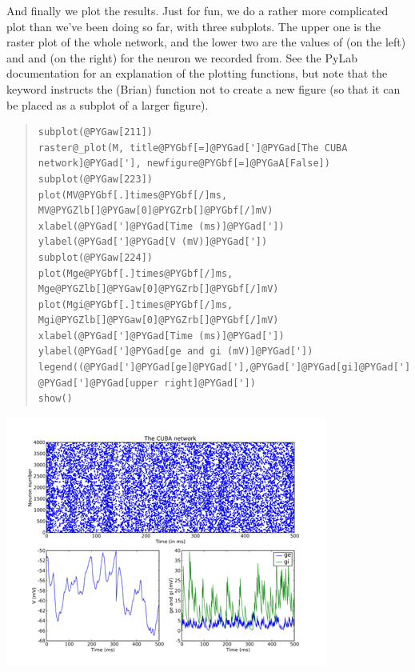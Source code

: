 \documentclass[letterpaper,10pt,english]{manual}
\begin{document}
And finally we plot the results. Just for fun, we do a rather more
complicated plot than we've been doing so far, with three subplots.
The upper one is the raster plot of the whole network, and the
lower two are the values of  (on the left) and  and  (on the
right) for the neuron we recorded from. See the PyLab documentation
for an explanation of the plotting functions, but note that the
\hyperlink{brian.raster_plot}{} keyword  instructs the (Brian) function
\hyperlink{brian.raster_plot}{} not to create a new figure (so that it can be placed
as a subplot of a larger figure).
\begin{quote}

\begin{Verbatim}[commandchars=@\[\]]
subplot(@PYGaw[211])
raster@_plot(M, title@PYGbf[=]@PYGad[']@PYGad[The CUBA network]@PYGad['], newfigure@PYGbf[=]@PYGaA[False])
subplot(@PYGaw[223])
plot(MV@PYGbf[.]times@PYGbf[/]ms, MV@PYGZlb[]@PYGaw[0]@PYGZrb[]@PYGbf[/]mV)
xlabel(@PYGad[']@PYGad[Time (ms)]@PYGad['])
ylabel(@PYGad[']@PYGad[V (mV)]@PYGad['])
subplot(@PYGaw[224])
plot(Mge@PYGbf[.]times@PYGbf[/]ms, Mge@PYGZlb[]@PYGaw[0]@PYGZrb[]@PYGbf[/]mV)
plot(Mgi@PYGbf[.]times@PYGbf[/]ms, Mgi@PYGZlb[]@PYGaw[0]@PYGZrb[]@PYGbf[/]mV)
xlabel(@PYGad[']@PYGad[Time (ms)]@PYGad['])
ylabel(@PYGad[']@PYGad[ge and gi (mV)]@PYGad['])
legend((@PYGad[']@PYGad[ge]@PYGad['],@PYGad[']@PYGad[gi]@PYGad[']), @PYGad[']@PYGad[upper right]@PYGad['])
show()
\end{Verbatim}
\end{quote}

\includegraphics{2c.jpg}

\resetcurrentobjects
\hypertarget{--doc-examples}{}
\end{document}
